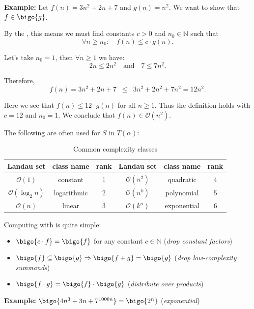 \textbf{Example: }Let $f(n) = 3n^2 + 2n + 7$ and $g(n) = n^2$.  
We want to show that $f \in \bigo{g}$.  

By the , this means we must find constants $c > 0$ and $n_0 \in \mathbb{N}$ such that
\[
\forall n \geq n_0 : \quad f(n) \leq c \cdot g(n).
\]

Let's take $n_0 = 1$, then $\forall n \geq 1$ we have:
\[
2n \leq 2n^2 \quad \text{and} \quad 7 \leq 7n^2.
\]

Therefore,
\[
f(n) = 3n^2 + 2n + 7 \;\;\leq\;\; 3n^2 + 2n^2 + 7n^2 = 12n^2.
\]

Here we see that $f(n) \leq 12 \cdot g(n)$ for all $n \geq 1$.  
Thus the definition holds with $c = 12$ and $n_0 = 1$.  
We conclude that $f(n) \in \mathcal{O}(n^2)$.

The following  are often used for $S$ in $T(\alpha)$:
\begin{table}[h]
\centering
\begin{tabular}{|c|c|c||c|c|c|}
\hline
\textbf{Landau set} & \textbf{class name} & \textbf{rank} &
\textbf{Landau set} & \textbf{class name} & \textbf{rank} \\
\hline
$\mathcal{O}(1)$          & constant     & 1 & $\mathcal{O}(n^2)$ & quadratic   & 4 \\
$\mathcal{O}(\log_2 n)$   & logarithmic  & 2 & $\mathcal{O}(n^k)$ & polynomial  & 5 \\
$\mathcal{O}(n)$          & linear       & 3 & $\mathcal{O}(k^n)$ & exponential & 6 \\
\hline
\end{tabular}
\caption{Common complexity classes}
\end{table}

Computing with  is quite simple:
\begin{itemize}
    \item $\bigo{ c \cdot f} = \bigo{f}$ for any constant $c \in \mathbb{N}$ (\textit{drop constant factors})
    \item $\bigo{f} \subseteq \bigo{g} \Rightarrow \bigo{f + g} = \bigo{g}$ (\textit{drop low-complexity summands})
    \item $\bigo{f \cdot g} = \bigo{f} \cdot \bigo{g}$ (\textit{distribute over products})
\end{itemize}
\textbf{Example: }$\bigo{4n^3 + 3n + 7^{1000n}} = \bigo{2^n}$ (\textit{exponential})

